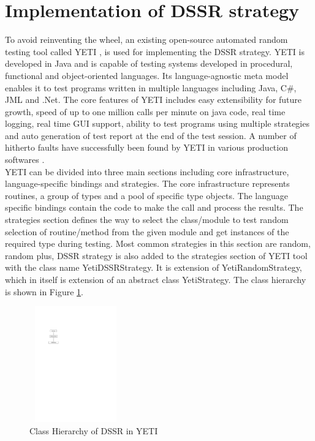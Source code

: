 \documentclass[conference]{IEEEtran}
\begin{document}
\section{Implementation of DSSR strategy}
To avoid reinventing the wheel, an existing open-source automated random testing tool called YETI \cite{Oriol2011}, \cite{Oriol2012} is used for implementing the DSSR strategy. YETI is developed in Java and is capable of testing systems developed in procedural, functional and object-oriented languages. Its language-agnostic meta model enables it to test programs written in multiple languages including Java, C\#, JML and .Net. The core features of YETI includes easy extensibility for future growth, speed of up to one million calls per minute on java code, real time logging, real time GUI support, ability to test programs using multiple strategies and auto generation of test report at the end of the test session. A number of hitherto faults have successfully been found by YETI in various production softwares \cite{Oriol2012}. \\
\indent YETI can be divided into three main sections including core infrastructure, language-specific bindings and strategies. The core infrastructure represents routines, a group of types and a pool of specific type objects. The language specific bindings contain the code to make the call and process the results. The strategies section defines the way to select the class/module to test random selection of routine/method from the given module and get instances of the required type during testing. Most common strategies in this section are random, random plus, DSSR strategy is also added to the strategies section of YETI tool with the class name YetiDSSRStrategy. It is extension of YetiRandomStrategy, which in itself is extension of an abstract class YetiStrategy. The class hierarchy is shown in Figure \ref{fig:hierarchyofDSSR}.

\begin{figure}[ht]
\centering
\includegraphics[width=4cm,height=5cm]{hierarchy.pdf}
\caption{Class Hierarchy of DSSR in YETI}
\label{fig:hierarchyofDSSR}
\end{figure}
\end{document}
